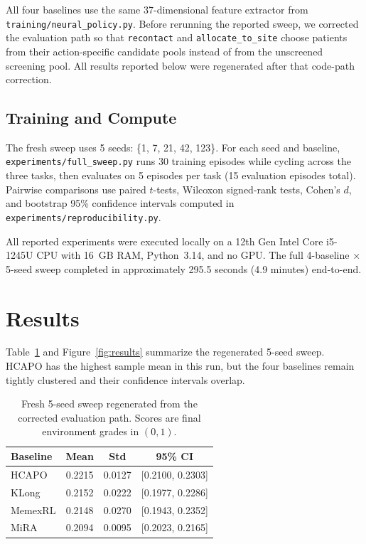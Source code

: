 \documentclass{article}
\begin{document}
All four baselines use the same 37-dimensional feature extractor from \texttt{training/neural\_policy.py}. Before rerunning the reported sweep, we corrected the evaluation path so that \texttt{recontact} and \texttt{allocate\_to\_site} choose patients from their action-specific candidate pools instead of from the unscreened screening pool. All results reported below were regenerated after that code-path correction.

\subsection{Training and Compute}

The fresh sweep uses 5 seeds: \{1, 7, 21, 42, 123\}. For each seed and baseline, \texttt{experiments/full\_sweep.py} runs 30 training episodes while cycling across the three tasks, then evaluates on 5 episodes per task (15 evaluation episodes total). Pairwise comparisons use paired $t$-tests, Wilcoxon signed-rank tests, Cohen's $d$, and bootstrap 95\% confidence intervals computed in \texttt{experiments/reproducibility.py}.

All reported experiments were executed locally on a 12th Gen Intel Core i5-1245U CPU with 16~GB RAM, Python~3.14, and no GPU. The full 4-baseline $\times$ 5-seed sweep completed in approximately 295.5 seconds (4.9 minutes) end-to-end.

\section{Results}

Table~\ref{tab:results} and Figure~\ref{fig:results} summarize the regenerated 5-seed sweep. HCAPO has the highest sample mean in this run, but the four baselines remain tightly clustered and their confidence intervals overlap.

\begin{table}[t]
  \centering
  \caption{Fresh 5-seed sweep regenerated from the corrected evaluation path. Scores are final environment grades in $(0, 1)$.}
  \label{tab:results}
  \begin{tabular}{lccc}
    \toprule
    Baseline & Mean & Std & 95\% CI \\
    \midrule
    HCAPO & 0.2215 & 0.0127 & [0.2100, 0.2303] \\
    KLong & 0.2152 & 0.0222 & [0.1977, 0.2286] \\
    MemexRL & 0.2148 & 0.0270 & [0.1943, 0.2352] \\
    MiRA & 0.2094 & 0.0095 & [0.2023, 0.2165] \\
    \bottomrule
  \end{tabular}
\end{table}
\end{document}
